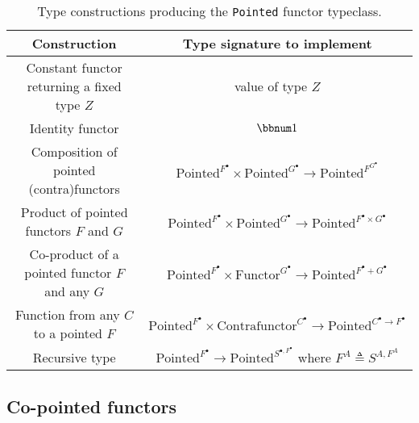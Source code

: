 \begin{table}
\begin{centering}
\begin{tabular}{|c|c|}
\hline 
\textbf{\footnotesize{}Construction} & \textbf{\footnotesize{}Type signature to implement}\tabularnewline
\hline 
\hline 
{\footnotesize{}Constant functor returning a fixed type $Z$} & {\footnotesize{}value of type $Z$}\tabularnewline
\hline 
{\footnotesize{}Identity functor} & {\footnotesize{}$\bbnum 1$}\tabularnewline
\hline 
{\footnotesize{}Composition of pointed (contra)functors} & {\footnotesize{}$\text{Pointed}^{F^{\bullet}}\times\text{Pointed}^{G^{\bullet}}\rightarrow\text{Pointed}^{F^{G^{\bullet}}}$}\tabularnewline
\hline 
{\footnotesize{}Product of pointed functors $F$ and $G$} & {\footnotesize{}$\text{Pointed}^{F^{\bullet}}\times\text{Pointed}^{G^{\bullet}}\rightarrow\text{Pointed}^{F^{\bullet}\times G^{\bullet}}$}\tabularnewline
\hline 
{\footnotesize{}Co-product of a pointed functor $F$ and any $G$} & {\footnotesize{}$\text{Pointed}^{F^{\bullet}}\times\text{Functor}^{G^{\bullet}}\rightarrow\text{Pointed}^{F^{\bullet}+G^{\bullet}}$}\tabularnewline
\hline 
{\footnotesize{}Function from any $C$ to a pointed $F$} & {\footnotesize{}$\text{Pointed}^{F^{\bullet}}\times\text{Contrafunctor}^{C^{\bullet}}\rightarrow\text{Pointed}^{C^{\bullet}\rightarrow F^{\bullet}}$}\tabularnewline
\hline 
{\footnotesize{}Recursive type} & {\footnotesize{}$\text{Pointed}^{F^{\bullet}}\rightarrow\text{Pointed}^{S^{\bullet,F^{\bullet}}}$
where $F^{A}\triangleq S^{A,F^{A}}$}\tabularnewline
\hline 
\end{tabular}
\par\end{centering}
\caption{Type constructions producing the \lstinline!Pointed! functor typeclass.\label{tab:Type-constructions-for-pointed-functor}}
\end{table}


\subsection{Co-pointed functors\label{subsec:Co-pointed-functors}}

